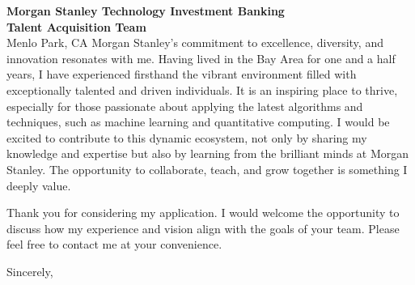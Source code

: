 \documentclass{letter}
\newcommand{\company}{Morgan Stanley Technology Investment Banking}
\begin{document}
\begin{letter}{\textbf{\company\ \\Talent Acquisition Team} \\                
    Menlo Park, CA }
Morgan Stanley's commitment to excellence, diversity, and innovation resonates with me. Having lived in the Bay Area for one and a half years, I have experienced firsthand the vibrant environment filled with exceptionally talented and driven individuals. It is an inspiring place to thrive, especially for those passionate about applying the latest algorithms and techniques, such as machine learning and quantitative computing. I would be excited to contribute to this dynamic ecosystem, not only by sharing my knowledge and expertise but also by learning from the brilliant minds at Morgan Stanley. The opportunity to collaborate, teach, and grow together is something I deeply value.

Thank you for considering my application. I would welcome the opportunity to discuss how my experience and vision align with the goals of your team. Please feel free to contact me at your convenience.

\closing{Sincerely,}

\end{letter}
\end{document}
